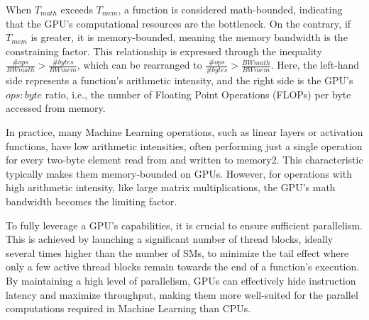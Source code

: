 When $ T_{math} $ exceeds $ T_{mem} $, a function is considered math-bounded, indicating that the GPU's computational resources are the bottleneck. On the contrary, if $ T_{mem} $ is greater, it is memory-bounded, meaning the memory bandwidth is the constraining factor. This relationship is expressed through the inequality $ \frac{\# ops}{BW{math}} > \frac{\# bytes}{BW{mem}} $, which can be rearranged to $ \frac{\# ops}{\# bytes} > \frac{BW{math}}{BW{mem}} $. Here, the left-hand side represents a function's arithmetic intensity, and the right side is the GPU's $ops:byte$ ratio, i.e., the number of Floating Point Operations (FLOPs) per byte accessed from memory.

In practice, many Machine Learning operations, such as linear layers or activation functions, have low arithmetic intensities, often performing just a single operation for every two-byte element read from and written to memory2. This characteristic typically makes them memory-bounded on GPUs. However, for operations with high arithmetic intensity, like large matrix multiplications, the GPU's math bandwidth becomes the limiting factor.

To fully leverage a GPU's capabilities, it is crucial to ensure sufficient parallelism. This is achieved by launching a significant number of thread blocks, ideally several times higher than the number of SMs, to minimize the tail effect where only a few active thread blocks remain towards the end of a function's execution. By maintaining a high level of parallelism, GPUs can effectively hide instruction latency and maximize throughput, making them more well-suited for the parallel computations required in Machine Learning than CPUs.
